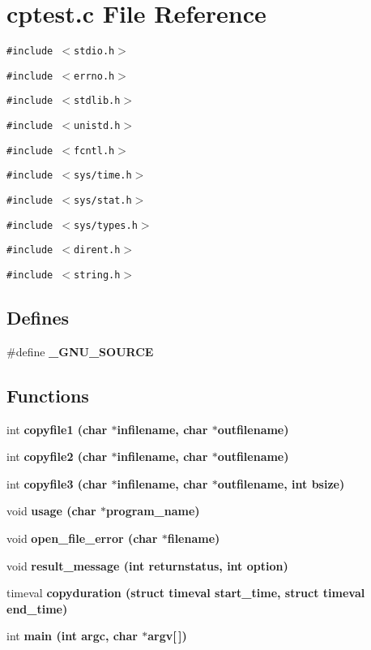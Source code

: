 \section{cptest.c File Reference}
\label{cptest_8c}
{\tt \#include $<$stdio.h$>$}\par
{\tt \#include $<$errno.h$>$}\par
{\tt \#include $<$stdlib.h$>$}\par
{\tt \#include $<$unistd.h$>$}\par
{\tt \#include $<$fcntl.h$>$}\par
{\tt \#include $<$sys/time.h$>$}\par
{\tt \#include $<$sys/stat.h$>$}\par
{\tt \#include $<$sys/types.h$>$}\par
{\tt \#include $<$dirent.h$>$}\par
{\tt \#include $<$string.h$>$}\par
\subsection*{Defines}
\begin{CompactItemize}
\item 
\#define \bf{\_\-GNU\_\-SOURCE}
\end{CompactItemize}
\subsection*{Functions}
\begin{CompactItemize}
\item 
int \bf{copyfile1} (char $\ast$infilename, char $\ast$outfilename)
\item 
int \bf{copyfile2} (char $\ast$infilename, char $\ast$outfilename)
\item 
int \bf{copyfile3} (char $\ast$infilename, char $\ast$outfilename, int bsize)
\item 
void \bf{usage} (char $\ast$program\_\-name)
\item 
void \bf{open\_\-file\_\-error} (char $\ast$filename)
\item 
void \bf{result\_\-message} (int returnstatus, int option)
\item 
timeval \bf{copyduration} (struct timeval start\_\-time, struct timeval end\_\-time)
\item 
int \bf{main} (int argc, char $\ast$argv[$\,$])
\end{CompactItemize}


